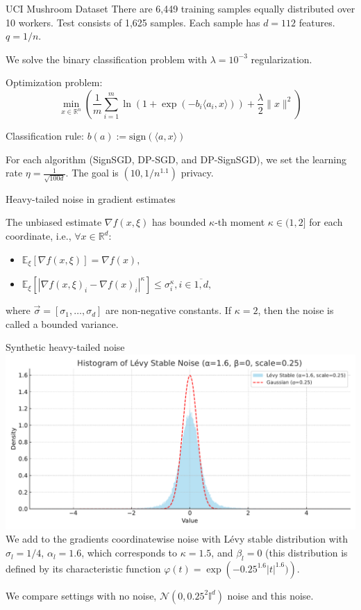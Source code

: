 \documentclass{beamer}
\newcommand{\EE}{\mathbb{E}}
\newcommand{\R}{\mathbb{R}}
\begin{document}
\begin{frame}{UCI Mushroom Dataset}
There are 6,449 training samples equally distributed over 10 workers. Test consists of 1,625 samples. Each sample has $d = 112$ features. $q = 1/n$.

We solve the binary classification problem with $\lambda = 10^{-3}$ regularization.

\bigskip

Optimization problem:
$$\min_{x \in \mathbb{R}^n} \left( \frac{1}{m} \sum_{i=1}^m \ln(1 + \exp(-b_i \langle a_i, x \rangle)) + \frac{\lambda}{2} \|x\|^2 \right)
$$

Classification rule:
$b(a) := \text{sign}(\langle a, x \rangle)$

\bigskip

For each algorithm (SignSGD, DP-SGD, and DP-SignSGD), we set the learning rate $\eta=\frac{1}{\sqrt{100 d}}$. The goal is $(10, 1/n^{1.1})$ privacy.
\end{frame}
\begin{frame}{Heavy-tailed noise in gradient estimates}

    The unbiased estimate $\nabla f (x, \xi)$  has bounded $\kappa$-th moment $\kappa \in (1,2]$ for each coordinate, i.e., $\forall x \in \R^d$: 
    \begin{itemize}
        \item $\EE_\xi [\nabla f (x, \xi)] = \nabla f(x),$
        \item $\EE_\xi [|\nabla f (x, \xi)_i - \nabla f(x)_i|^\kappa] \leq \sigma_i^\kappa, i \in \overline{1,d},$
    \end{itemize}
    where $\Vec{\sigma} = [\sigma_1, \dots, \sigma_d]$ are non-negative constants.
    If $\kappa = 2$, then the noise is called a bounded variance. 

\end{frame}
\begin{frame}{Synthetic heavy-tailed noise}
\includegraphics[width=1.0\textwidth]{levy_stable_histogram} 
We add to the gradients coordinatewise noise with Lévy stable distribution with $\sigma_l = 1/4$, $\alpha_l=1.6$, which corresponds to $\kappa=1.5$, and $\beta_l=0$ (this distribution is defined by its characteristic function $\varphi(t)=\exp\left(-0.25^{1.6}|t|^{1.6})\right)$.

We compare settings with no noise, $\mathcal{N}(0, 0.25^2\mathbb{I}^d)$ noise and this noise.
\end{frame}
\end{document}
